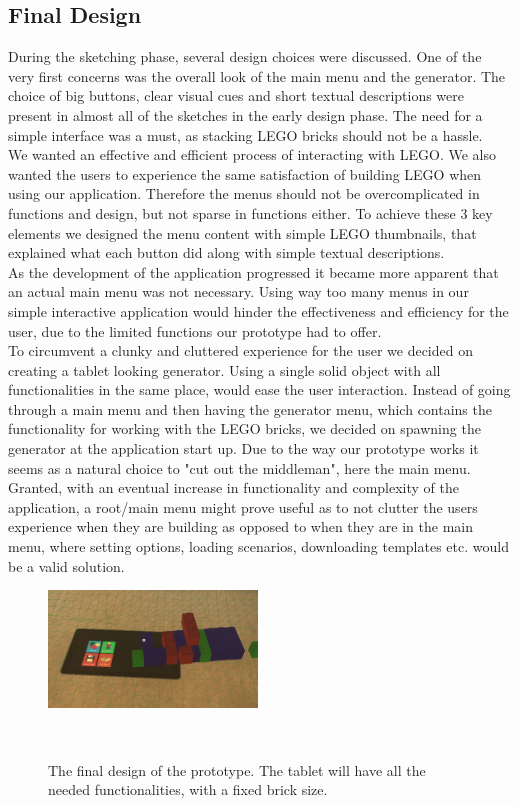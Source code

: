 \subsection{Final Design}
During the sketching phase, several design choices were discussed. One of the very first concerns was the overall look of the main menu and the generator. The choice of big buttons, clear visual cues and short textual descriptions were present in almost all of the sketches in the early design phase. The need for a simple interface was a must, as stacking LEGO bricks should not be a hassle. \\
We wanted an effective and efficient process of interacting with LEGO. We also wanted the users to experience the same satisfaction of building LEGO when using our application. Therefore the menus should not be overcomplicated in functions and design, but not sparse in functions either. To achieve these 3 key elements we designed the menu content with simple LEGO thumbnails, that explained what each button did along with simple textual descriptions. \\
As the development of the application progressed it became more  apparent that an actual main menu was not necessary. Using way too many menus in our simple interactive application would hinder the effectiveness and efficiency for the user, due to the limited functions our prototype had to offer. \\
To circumvent a clunky and cluttered experience for the user we decided on creating a tablet looking generator. Using a single solid object with all functionalities in the same place, would ease the user interaction. Instead of going through a main menu and then having the generator menu, which contains the functionality for working with the LEGO bricks, we decided on spawning the generator at the application start up. Due to the way our prototype works it seems as a natural choice to "cut out the middleman", here the main menu.  \\ 
Granted, with an eventual increase in functionality and complexity of the application, a root/main menu might prove useful as to not clutter the users experience when they are building as opposed to when they are in the main menu, where setting options, loading scenarios, downloading templates etc. would be a valid solution.\\
\begin{figure}[t]
	\centering
	\includegraphics[width=210px]{figures/finaldesign.jpg}
	\caption{The final design of the prototype. The tablet will have all the needed functionalities, with a fixed brick size.}~\label{fig:finaldesign}
\end{figure}
